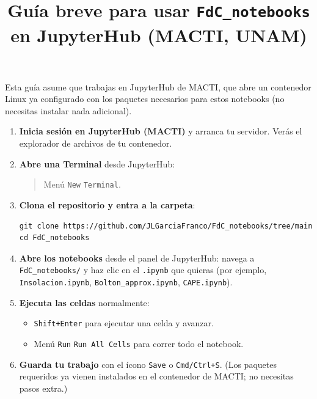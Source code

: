 \documentclass[11pt]{article}
\title{Guía breve para usar \texttt{FdC\_notebooks} en JupyterHub (MACTI, UNAM)}
\author{}
\date{}
\begin{document}
\maketitle

Esta guía asume que trabajas en JupyterHub de MACTI, que abre un contenedor Linux ya configurado con los paquetes necesarios para estos notebooks (no necesitas instalar nada adicional).

\begin{enumerate}
  \item \textbf{Inicia sesión en JupyterHub (MACTI)} y arranca tu servidor. Verás el explorador de archivos de tu contenedor.

  \item \textbf{Abre una Terminal} desde JupyterHub:
  \begin{quote}
  Menú \texttt{New} \textrightarrow{} \texttt{Terminal}.
  \end{quote}

  \item \textbf{Clona el repositorio y entra a la carpeta}:
\begin{verbatim}
git clone https://github.com/JLGarciaFranco/FdC_notebooks/tree/main
cd FdC_notebooks
\end{verbatim}


  \item \textbf{Abre los notebooks} desde el panel de JupyterHub: navega a \texttt{FdC\_notebooks/} y haz clic en el \texttt{.ipynb} que quieras (por ejemplo, \texttt{Insolacion.ipynb}, \texttt{Bolton\_approx.ipynb}, \texttt{CAPE.ipynb}).

  \item \textbf{Ejecuta las celdas} normalmente:
  \begin{itemize}
    \item \texttt{Shift+Enter} para ejecutar una celda y avanzar.
    \item Menú \texttt{Run} \textrightarrow{} \texttt{Run All Cells} para correr todo el notebook.
  \end{itemize}

  \item \textbf{Guarda tu trabajo} con el ícono \texttt{Save} o \texttt{Cmd/Ctrl+S}. (Los paquetes requeridos ya vienen instalados en el contenedor de MACTI; no necesitas pasos extra.)


\end{enumerate}
\end{document}

